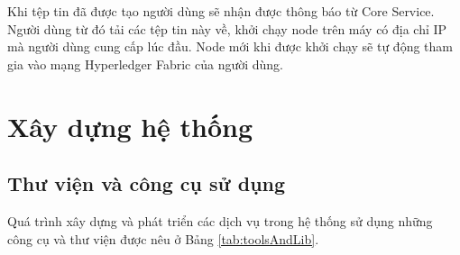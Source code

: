 \documentclass[../DoAn.tex]{subfiles}
\begin{document}
Khi tệp tin đã được tạo người dùng sẽ nhận được thông báo từ Core Service. Người dùng từ đó tải các
tệp tin này về, khởi chạy node trên máy có địa chỉ IP mà người dùng cung cấp
lúc đầu. Node mới khi được khởi chạy sẽ tự động tham gia vào mạng Hyperledger Fabric của người dùng.

\section{Xây dựng hệ thống}
\subsection{Thư viện và công cụ sử dụng}
Quá trình xây dựng và phát triển các dịch vụ trong hệ thống sử dụng những công
cụ và thư viện được nêu ở Bảng \ref{tab:toolsAndLib}.
\end{document}
